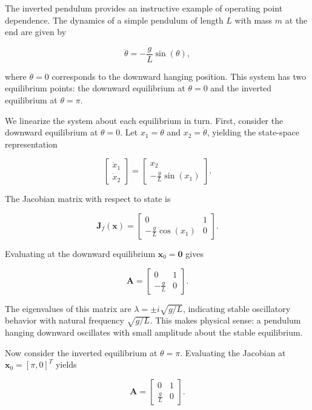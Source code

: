 \begin{example}
The inverted pendulum provides an instructive example of operating point dependence. The dynamics of a simple pendulum of length $L$ with mass $m$ at the end are given by

\[
\ddot{\theta} = -\frac{g}{L}\sin(\theta),
\]

where $\theta = 0$ corresponds to the downward hanging position. This system has two equilibrium points: the downward equilibrium at $\theta = 0$ and the inverted equilibrium at $\theta = \pi$.

We linearize the system about each equilibrium in turn. First, consider the downward equilibrium at $\theta = 0$. Let $x_1 = \theta$ and $x_2 = \dot{\theta}$, yielding the state-space representation

\[
\begin{bmatrix} \dot{x}_1 \\ \dot{x}_2 \end{bmatrix} = \begin{bmatrix} x_2 \\ -\frac{g}{L}\sin(x_1) \end{bmatrix}.
\]

The Jacobian matrix with respect to state is

\[
\mathbf{J}_f(\mathbf{x}) = \begin{bmatrix} 0 & 1 \\ -\frac{g}{L}\cos(x_1) & 0 \end{bmatrix}.
\]

Evaluating at the downward equilibrium $\mathbf{x}_0 = \mathbf{0}$ gives

\[
\mathbf{A} = \begin{bmatrix} 0 & 1 \\ -\frac{g}{L} & 0 \end{bmatrix}.
\]

The eigenvalues of this matrix are $\lambda = \pm i\sqrt{g/L}$, indicating stable oscillatory behavior with natural frequency $\sqrt{g/L}$. This makes physical sense: a pendulum hanging downward oscillates with small amplitude about the stable equilibrium.

Now consider the inverted equilibrium at $\theta = \pi$. Evaluating the Jacobian at $\mathbf{x}_0 = [\pi, 0]^T$ yields

\[
\mathbf{A} = \begin{bmatrix} 0 & 1 \\ \frac{g}{L} & 0 \end{bmatrix}.
\]


\end{example}
